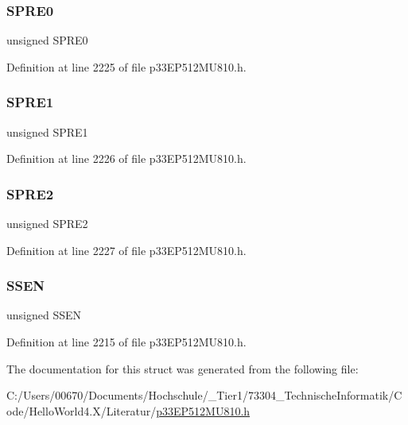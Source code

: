 \subsubsection{\texorpdfstring{S\+P\+R\+E0}{SPRE0}}
{\footnotesize\ttfamily unsigned S\+P\+R\+E0}



Definition at line 2225 of file p33\+E\+P512\+M\+U810.\+h.

\mbox{\label{structtag_s_p_i3_c_o_n1_b_i_t_s_aa10bf0541cfc6de804735f5e3beca089}} 
\subsubsection{\texorpdfstring{S\+P\+R\+E1}{SPRE1}}
{\footnotesize\ttfamily unsigned S\+P\+R\+E1}



Definition at line 2226 of file p33\+E\+P512\+M\+U810.\+h.

\mbox{\label{structtag_s_p_i3_c_o_n1_b_i_t_s_ad98c0587f19b608e8e40e67d2327634c}} 
\subsubsection{\texorpdfstring{S\+P\+R\+E2}{SPRE2}}
{\footnotesize\ttfamily unsigned S\+P\+R\+E2}



Definition at line 2227 of file p33\+E\+P512\+M\+U810.\+h.

\mbox{\label{structtag_s_p_i3_c_o_n1_b_i_t_s_ae77e6e9fafcdae4e5b7f261d00459ade}} 
\subsubsection{\texorpdfstring{S\+S\+EN}{SSEN}}
{\footnotesize\ttfamily unsigned S\+S\+EN}



Definition at line 2215 of file p33\+E\+P512\+M\+U810.\+h.



The documentation for this struct was generated from the following file\+:\begin{DoxyCompactItemize}
\item 
C\+:/\+Users/00670/\+Documents/\+Hochschule/\+\_\+\+Tier1/73304\+\_\+\+Technische\+Informatik/\+Code/\+Hello\+World4.\+X/\+Literatur/\hyperlink{p33_e_p512_m_u810_8h}{p33\+E\+P512\+M\+U810.\+h}\end{DoxyCompactItemize}
